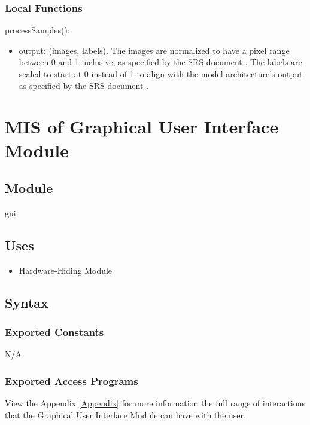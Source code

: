 \documentclass[12pt, titlepage]{article}
\begin{document}
\subsubsection{Local Functions}

\noindent processSamples():
\begin{itemize}
\item output: (images, labels). The images are normalized to have a pixel range
between 0 and 1 inclusive, as specified by the SRS document \citep{SRS}. The
labels are scaled to start at 0 instead of 1 to align with the model
architecture's output as specified by the SRS document \citep{SRS}.
\end{itemize}


\newpage
\section{MIS of Graphical User Interface Module} \label{MGUI}

\subsection{Module}

gui
\subsection{Uses}

\begin{itemize}
  \item Hardware-Hiding Module
\end{itemize}

\subsection{Syntax}

\subsubsection{Exported Constants}

N/A

\subsubsection{Exported Access Programs}


View the Appendix \ref{Appendix} for more information the full range of
interactions that the Graphical User Interface Module can have with the user.
\end{document}
